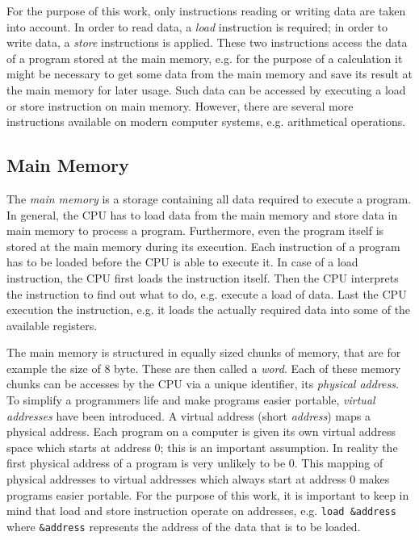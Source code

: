 \documentclass[onecolumn, openright, master, english, signatures]{dbrgrptt}
\begin{document}
For the purpose of this work, only instructions reading or writing data are taken into account. In order to read data, a \emph{load} instruction is required; in order to write data, a \emph{store} instructions is applied. These two instructions access the data of a program stored at the main memory, e.g. for the purpose of a calculation it might be necessary to get some data from the main memory and save its result at the main memory for later usage. Such data can be accessed by executing a load or store instruction on main memory. However, there are several more instructions available on modern computer systems, e.g. arithmetical operations.

\subsection{Main Memory}
The \emph{main memory} is a storage containing all data required to execute a program. In general, the \ac{CPU} has to load data from the main memory and store data in main memory to process a program. Furthermore, even the program itself is stored at the main memory during its execution. Each instruction of a program has to be loaded before the \ac{CPU} is able to execute it. In case of a load instruction, the \ac{CPU} first loads the instruction itself. Then the CPU interprets the instruction to find out what to do, e.g. execute a load of data. Last the \ac{CPU} execution the instruction, e.g. it loads the actually required data into some of the available registers.

The main memory is structured in equally sized chunks of memory, that are for example the size of 8 byte. These are then called a \emph{word}. Each of these memory chunks can be accesses by the \ac{CPU} via a unique identifier, its \emph{physical address}. To simplify a programmers life and make programs easier portable, \emph{virtual addresses} have been introduced. A virtual address (short \emph{address}) maps a physical address. Each program on a computer is given its own virtual address space which starts at address 0; this is an important assumption. In reality the first physical address of a program is very unlikely to be 0. This mapping of physical addresses to virtual addresses which always start at address 0 makes programs easier portable. For the purpose of this work, it is important to keep in mind that load and store instruction operate on addresses, e.g. \texttt{load \&address} where \texttt{\&address} represents the address of the data that is to be loaded.
\end{document}
